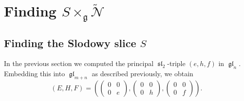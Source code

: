 \documentclass[12pt,psamsfonts]{article}
\DeclareMathOperator{\gl}{\mathfrak{gl}}
\DeclareMathOperator{\spl}{\mathfrak{sl}}
\begin{document}

\section{Finding \(S \times_\mathfrak{g} \widetilde{\mathcal{N}}\)}
\subsection{Finding the Slodowy slice \(S\)}
In the previous section we computed the principal \(\spl_2\)-triple \((e, h, f)\) in \(\gl_n\).
Embedding this into \(\gl_{m + n}\) as described previously, we obtain
\[(E, H, F) = \left(\begin{pmatrix}0 & 0 \\0 & e\end{pmatrix}, \begin{pmatrix}0 & 0 \\0 & h\end{pmatrix}, \begin{pmatrix}0 & 0 \\0 & f\end{pmatrix}\right).\]
\end{document}
